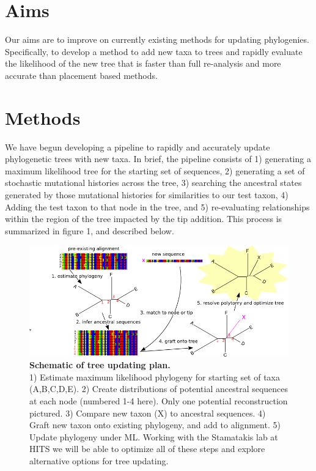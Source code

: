 \documentclass[10pt]{article}
\begin{document}
\section*{Aims}
Our aims are to improve on currently existing methods for updating phylogenies. 
Specifically, to develop a method to add new taxa to trees and rapidly evaluate the likelihood of the new tree that is faster than full re-analysis and more accurate than placement based methods.
 
\section*{Methods}

We have begun developing a pipeline to rapidly and accurately update phylogenetic trees with new taxa. 
In brief, the pipeline consists of
    1) generating a maximum likelihood tree for the starting set of sequences,
    2) generating a set of stochastic mutational histories across the tree,
    3) searching the ancestral states generated by those mutational histories for similarities to our test taxon,
    4) Adding the test taxon to that node in the tree, and
    5) re-evaluating relationships within the region of the tree impacted by the tip addition. 
This process is summarized in figure 1, and described below.

\begin{figure}[!ht]
\begin{center}
\includegraphics[scale=.7]{fig.png}
\end{center}
\caption{
{\bf Schematic of tree updating plan. \\
}  1) Estimate maximum likelihood phylogeny for starting set of taxa (A,B,C,D,E).
2) Create distributions of potential ancestral sequences at each node (numbered 1-4 here).
Only one potential reconstruction pictured.
3) Compare new taxon (X) to ancestral sequences.
4) Graft new taxon onto existing phylogeny, and add to alignment.
5) Update phylogeny under ML.
Working with the Stamatakis lab at HITS we will be able to optimize all of these steps and explore alternative options for tree updating.
}
\label{Figure_label}
\end{figure}
\end{document}
